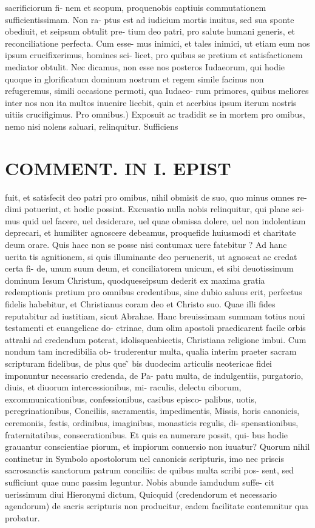 \documentclass{article}
\begin{document}
\begin{pages}
sacrificiorum fi- nem et scopum, proquenobis captiuis commutationem sufficientissimam. Non ra- ptus est ad iudicium mortis inuitus, sed sua sponte obediuit, et seipsum obtulit pre- tium deo patri, pro salute humani generis, et reconciliatione perfecta. Cum esse- mus inimici, et tales inimici, ut etiam eum nos ipsum crucifixerimus, homines sci- licet, pro quibus se pretium et satisfactionem mediator obtulit. Nec dicamus, non esse nos posteros Iudaeorum, qui hodie quoque  in glorificatum dominum nostrum et regem simile facinus non refugeremus, simili occasione permoti, qua Iudaeo- rum primores, quibus meliores inter nos non ita multos inuenire licebit, quin et acerbius ipsum iterum nostris uitiis crucifigimus. Pro omnibus.) Exposuit ac tradidit se in mortem pro omibus, nemo nisi nolens saluari, relinquitur. Sufficiens  \pend
\section*{COMMENT. IN I. EPIST }
\marginpar{[ p.484 ]}\pstart fuit, et satisfecit deo patri pro omibus, nihil obmisit de suo, quo minus omnes re- dimi potuerint, et hodie possint. Excusatio nulla nobis relinquitur, qui plane sci- mus quid uel facere, uel desiderare, uel quae obmissa dolere, uel non indolentiam deprecari, et humiliter agnoscere debeamus, proquefide huiusmodi et charitate deum orare. Quis haec non se posse nisi contumax uere fatebitur ? Ad hanc uerita tis agnitionem, si quis illuminante deo peruenerit, ut agnoscat ac credat certa fi- de, unum suum deum, et conciliatorem unicum, et sibi deuotissimum dominum Iesum Christum, quodqueseipsum dederit ex maxima gratia redemptionis pretium pro omnibus credentibus, sine dubio saluus erit, perfectus fidelis habebitur, et Christianus coram deo et Christo suo. Quae illi fides reputabitur ad iustitiam, sicut Abrahae. Hanc breuissimam summam totius noui testamenti et euangelicae do- ctrinae, dum olim apostoli praedicarent facile orbis attrahi ad credendum poterat, idolisqueabiectis, Christiana religione imbui. Cum nondum tam incredibilia ob- truderentur multa, qualia interim praeter sacram scripturam fidelibus, de plus que ̃ bis duodecim articulis neotericae fidei imponuntur necessario credenda, de Pa- patu multa, de indulgentiis, purgatorio, diuis, et diuorum intercessionibus, mi- raculis, delectu ciborum, excommunicationibus, confessionibus, casibus episco- palibus, uotis, peregrinationibus, Conciliis, sacramentis, impedimentis, Missis, horis canonicis, ceremoniis, festis, ordinibus, imaginibus, monasticis regulis, di- spensationibus, fraternitatibus, consecrationibus. Et quis ea numerare possit, qui- bus hodie grauantur conscientiae piorum, et impiorum conuersio non iuuatur? Quorum nihil continetur in Symbolo apostolorum uel canonicis scripturis, imo nec priscis sacrosanctis sanctorum patrum conciliis: de quibus multa scribi pos- sent, sed sufficiunt quae nunc passim leguntur. Nobis abunde iamdudum suffe- cit uerissimum diui Hieronymi dictum, Quicquid (credendorum et necessario agendorum) de sacris scripturis non producitur, eadem facilitate contemnitur qua probatur.  \pend

\end{pages}
\end{document}
